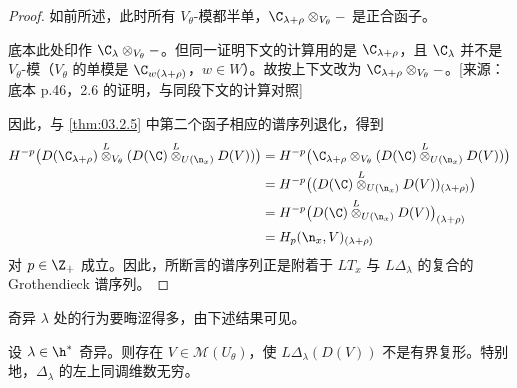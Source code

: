 \begin{proof}
如前所述，此时所有 $V_\theta$-模都半单，$\C_{\lambda+\rho}\otimes_{V_\theta}-$ 是正合函子。
\begin{annote}
底本此处印作 $\C_\lambda\otimes_{V_\theta}-$。但同一证明下文的计算用的是 $\C_{\lambda+\rho}$，且 $\C_\lambda$ 并不是 $V_\theta$-模（$V_\theta$ 的单模是 $\C_{w(\lambda+\rho)}$，$w\in W$）。故按上下文改为 $\C_{\lambda+\rho}\otimes_{V_\theta}-$。[来源：底本 p.46，2.6 的证明，与同段下文的计算对照]
\end{annote}
因此，与 \ref{thm:03.2.5} 中第二个函子相应的谱序列退化，得到
\begin{align*}
H^{-p}\bigl(D(\C_{\lambda+\rho})\overset{L}{\otimes}_{V_\theta}(D(\C)\overset{L}{\otimes}_{U(\n_x)}D(V))\bigr)
&=H^{-p}\bigl(\C_{\lambda+\rho}\otimes_{V_\theta}(D(\C)\overset{L}{\otimes}_{U(\n_x)}D(V))\bigr)\\
&=H^{-p}\bigl((D(\C)\overset{L}{\otimes}_{U(\n_x)}D(V))_{(\lambda+\rho)}\bigr)\\
&=H^{-p}\bigl(D(\C)\overset{L}{\otimes}_{U(\n_x)}D(V)\bigr)_{(\lambda+\rho)}\\
&=H_p(\n_x,V)_{(\lambda+\rho)}
\end{align*}
对 $p\in\Z_+$ 成立。因此，所断言的谱序列正是附着于 $LT_x$ 与 $L\Delta_\lambda$ 的复合的 Grothendieck 谱序列。
\end{proof}

奇异 $\lambda$ 处的行为要晦涩得多，由下述结果可见。

\begin{proposition}\label{prop:03.2.7}
设 $\lambda\in\h^*$ 奇异。则存在 $V\in\mathcal{M}(U_\theta)$，使 $L\Delta_\lambda(D(V))$ 不是有界复形。特别地，$\Delta_\lambda$ 的左上同调维数无穷。
\end{proposition}

